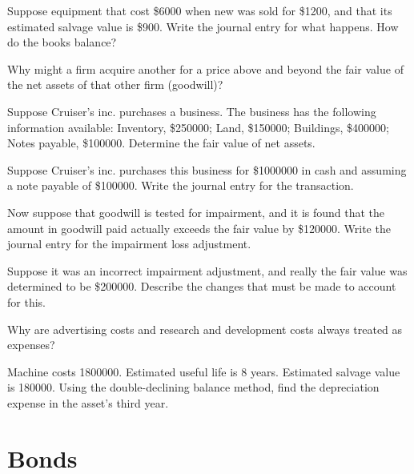 \documentclass{scrartcl}
\begin{document}
Suppose equipment that cost \$6000 when new was sold for \$1200, and 
that its estimated salvage value is \$900. Write the journal entry
for what happens. How do the books balance?

\vspace{10em}

Why might a firm acquire another for a price above and beyond the fair
value of the net assets of that other firm (goodwill)?

\vspace{10em}

Suppose Cruiser's inc. purchases a business. The business has the 
following information available: Inventory, \$250000; Land,
\$150000; Buildings, \$400000; Notes payable, \$100000. Determine the
fair value of net assets.

\vspace{10em}

Suppose Cruiser's inc. purchases this business for \$1000000 in cash 
and assuming a note payable of \$100000. Write the journal entry for
the transaction.

\vspace{10em}

Now suppose that goodwill is tested for impairment, and it is found that
the amount in goodwill paid actually exceeds the fair value by 
\$120000. Write the journal entry for the impairment loss adjustment. 

\vspace{10em}

Suppose it was an incorrect impairment adjustment, and really the fair
value was determined to be \$200000. Describe the changes that must be
made to account for this.

\phantom{Goodwill cannot be adjusted upwards! No change}

Why are advertising costs and research and development costs always
treated as expenses?

\vspace{10em}

Machine costs 1800000. Estimated useful life is 8 years. Estimated
salvage value is 180000. Using the double-declining balance method,
find the depreciation expense in the asset's third year. 

\vspace{10em}

\section{Bonds}
\end{document}
